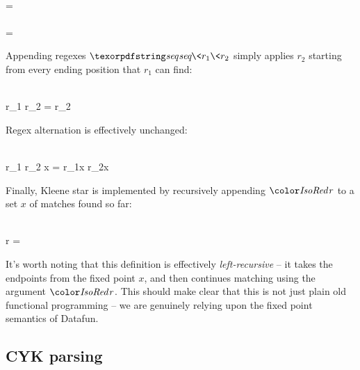 \nopagebreak[2]
\begin{code}
   \isa \iso\tchar \to \tre\\
   \< \<
  = 
  \\[8pt]
   \isa \tre \to \tre\\
   \< = 
\end{code}

\noindent
Appending regexes $\name{seq}\<r_1\<r_2$ simply applies $r_2$ starting from
every ending position that $r_1$ can find:

\nopagebreak[2]
\begin{code}
   \isa \tre \to \tre \to \tre\\
   \<r_1 \<r_2 \< =
  r_2 \<
\end{code}

\noindent
Regex alternation  is effectively unchanged:

\nopagebreak[2]
\begin{code}
   \isa \tre \to \tre \to \tre\\
   \<r_1 \<r_2 \<x = r_1\<x \vee r_2\<x
\end{code}

\noindent
Finally, Kleene star is implemented by recursively appending $\dvar r$ to a
set $x$ of matches found so far:

\nopagebreak[2]
\begin{code}
   \isa \iso\tre \to \tre\\
   \<\pboxvar r \<
  = 
\end{code}

\noindent
It's worth noting that this definition is effectively \emph{left-recursive} --
it takes the endpoints from the fixed point $x$, and then continues matching
using the argument $\dvar r$. This should make clear that this is not just plain
old functional programming -- we are genuinely relying upon the fixed point
semantics of Datafun.


\subsection{CYK parsing}
\label{cyk-parsing}

